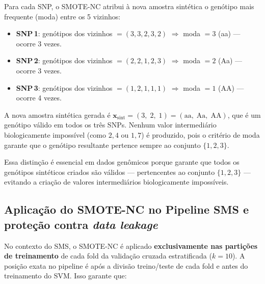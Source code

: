 \documentclass[
    12pt,
    a4paper,
    oneside,
    english,
    french,
    spanish,
    brazil
    ]{abntex2}
\newcommand{\novo}[1]{\textcolor{corNova}{#1}}
\begin{document}
\novo{Para cada SNP, o SMOTE-NC atribui à nova amostra sintética o genótipo mais frequente (moda) entre os 5 vizinhos:
\begin{itemize}
  \item \textbf{SNP\,1}: genótipos dos vizinhos $= (3, 3, 2, 3, 2)$ $\Rightarrow$ moda $= 3$ (aa) --- ocorre 3 vezes.
  \item \textbf{SNP\,2}: genótipos dos vizinhos $= (2, 2, 1, 2, 3)$ $\Rightarrow$ moda $= 2$ (Aa) --- ocorre 3 vezes.
  \item \textbf{SNP\,3}: genótipos dos vizinhos $= (1, 2, 1, 1, 1)$ $\Rightarrow$ moda $= 1$ (AA) --- ocorre 4 vezes.
\end{itemize}
A nova amostra sintética gerada é $\mathbf{x}_{\text{sint}} = (3,\; 2,\; 1) = (\text{aa},\; \text{Aa},\; \text{AA})$, que é um genótipo válido em todos os três SNPs. Nenhum valor intermediário biologicamente impossível (como $2{,}4$ ou $1{,}7$) é produzido, pois o critério de moda garante que o genótipo resultante pertence sempre ao conjunto $\{1, 2, 3\}$.}

\novo{Essa distinção é essencial em dados genômicos porque garante que todos os genótipos sintéticos criados são válidos --- pertencentes ao conjunto $\{1, 2, 3\}$ --- evitando a criação de valores intermediários biologicamente impossíveis.}

\subsection*{Aplicação do SMOTE-NC no Pipeline SMS e proteção contra \textit{data leakage}}

\novo{No contexto do SMS, o SMOTE-NC é aplicado \textbf{exclusivamente nas partições de treinamento} de cada fold da validação cruzada estratificada ($k = 10$). A posição exata no pipeline é após a divisão treino/teste de cada fold e antes do treinamento do SVM. Isso garante que:}
\end{document}
